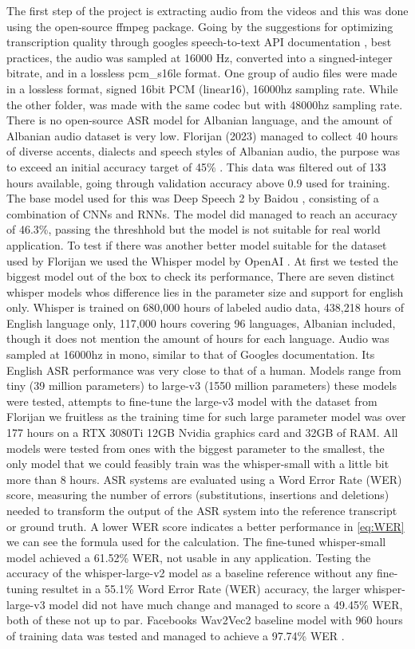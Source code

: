 \documentclass[12pt]{article}
\begin{document}
The first step of the project is extracting audio from the videos and this was done using the open-source ffmpeg package. Going by the suggestions for optimizing transcription quality through googles speech-to-text API documentation \cite{google_api_docs}, best practices, the audio was sampled at 16000 Hz, converted into a singned-integer bitrate, and in a lossless pcm\_s16le format. One group of audio files were made in a lossless format, signed 16bit PCM (linear16), 16000hz sampling rate. While the other folder, was made with the same codec but with 48000hz sampling rate.\\There is no open-source ASR model for Albanian language, and the amount of Albanian audio dataset is very low. Florijan (2023) managed to collect 40 hours of diverse accents, dialects and speech styles of Albanian audio, the purpose was to exceed an initial accuracy target of 45\% \cite{florijan-qosja}. This data was filtered out of 133 hours available, going through validation accuracy above 0.9 used for training. The base model used for this was Deep Speech 2 by Baidou \cite{deep-speech}, consisting of a combination of CNNs and RNNs. The model did managed to reach an accuracy of 46.3\%, passing the threshhold but the model is not suitable for real world application. To test if there was another better model suitable for the dataset used by Florijan we used the Whisper model by OpenAI \cite{openai_whisper}. At first we tested the biggest model out of the box to check its performance, There are seven distinct whisper models whos difference lies in the parameter size and support for english only. Whisper is trained on 680,000 hours of labeled audio data, 438,218 hours of English language only, 117,000 hours covering 96 languages, Albanian included, though it does not mention the amount of hours for each language. Audio was sampled at 16000hz in mono, similar to that of Googles documentation. Its English ASR performance was very close to that of a human. Models range from tiny (39 million parameters) to large-v3 (1550 million parameters) these models were tested, attempts to fine-tune the large-v3 model with the dataset from Florijan we fruitless as the training time for such large parameter model was over 177 hours on a RTX 3080Ti 12GB Nvidia graphics card and 32GB of RAM. All models were tested from ones with the biggest parameter to the smallest, the only model that we could feasibly train was the whisper-small with a little bit more than 8 hours. ASR systems are evaluated using a Word Error Rate (WER) score, measuring the number of errors (substitutions, insertions and deletions) needed to transform the output of the ASR system into the reference transcript or ground truth. A lower WER score indicates a better performance in \ref{eq:WER} we can see the formula used for the calculation. The fine-tuned whisper-small model achieved a 61.52\% WER, not usable in any application. Testing the accuracy of the whisper-large-v2 model as a baseline reference without any fine-tuning resultet in a 55.1\% Word Error Rate (WER) accuracy, the larger whisper-large-v3 model did not have much change and managed to score a 49.45\% WER, both of these not up to par. Facebooks Wav2Vec2 baseline model with 960 hours of training data was tested and managed to achieve a 97.74\% WER \cite{facebook-wav2vec}. 
\end{document}
